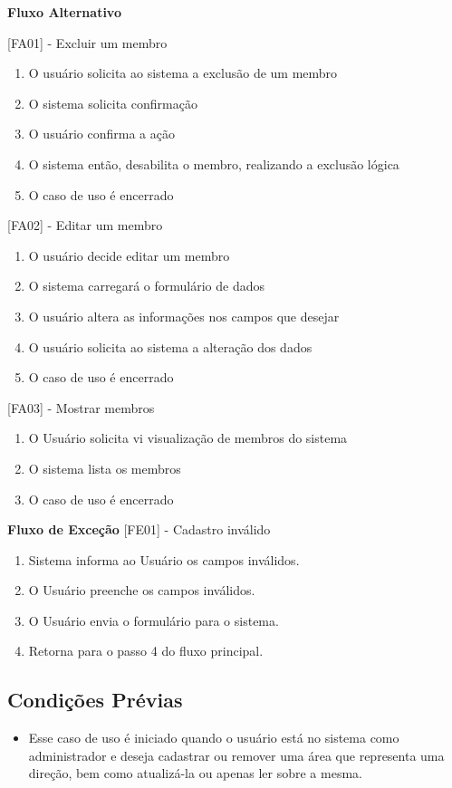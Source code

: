 \begin{apendicesenv}
\textbf{Fluxo Alternativo}

[FA01] - Excluir um membro
\begin{enumerate}
  \item{O usuário solicita ao sistema a exclusão de um membro}
  \item{O sistema solicita confirmação}
  \item{O usuário confirma a ação}
  \item{O sistema então, desabilita o membro, realizando a exclusão lógica}
  \item{O caso de uso é encerrado}
\end{enumerate}

[FA02] - Editar um membro
\begin{enumerate}
  \item{O usuário decide editar um membro}
  \item{O sistema carregará o formulário de dados}
  \item{O usuário altera as informações nos campos que desejar}
  \item{O usuário solicita ao sistema a alteração dos dados}
  \item{O caso de uso é encerrado}
\end{enumerate}

[FA03] - Mostrar membros
\begin{enumerate}
  \item{O Usuário solicita vi visualização de membros do sistema}
  \item{O sistema lista os membros}
  \item{O caso de uso é encerrado}
\end{enumerate}

\textbf{Fluxo de Exceção}
[FE01] - Cadastro inválido
\begin{enumerate}
\item{Sistema informa ao Usuário os campos inválidos.}
\item{O Usuário preenche os campos inválidos.}
\item{O Usuário envia o formulário para o sistema.}
\item{Retorna para o passo 4 do fluxo principal.}
\end{enumerate}


\subsection{Condições Prévias}
\begin{itemize}
\item{Esse caso de uso é iniciado quando o usuário está no sistema como administrador e deseja cadastrar ou remover uma área que representa uma direção, bem como atualizá-la ou apenas ler sobre a mesma.}
\end{itemize}


\end{apendicesenv}
